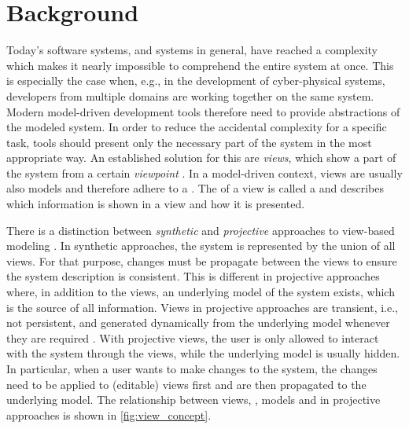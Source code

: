 \section{Background}
\label{sec:Background}

Today's software systems, and systems in general, have reached a complexity which makes it nearly impossible to comprehend the entire system at once.
This is especially the case when, e.g., in the development of cyber-physical systems, developers from multiple domains are working together on the same system.
Modern model-driven development tools therefore need to provide abstractions of the modeled system.
In order to reduce the accidental complexity for a specific task, tools should present only the necessary part of the system in the most appropriate way.
An established solution for this are \emph{views}, which show a part of the system from a certain \emph{viewpoint} \autocite{atkinson_orthographic_2010}.
In a model-driven context, views are usually also models and therefore adhere to a \metamodel.
The \metamodel of a view is called a \viewtype \autocite{goldschmidt_towards_2012} and describes which information is shown in a view and how it is presented.

There is a distinction between \emph{synthetic} and \emph{projective} approaches to view-based modeling \autocite{atkinson_fundamental_2015}.
In synthetic approaches, the system is represented by the union of all views.
For that purpose, changes must be propagate between the views to ensure the system description is consistent.
This is different in projective approaches where, in addition to the views, an underlying model of the system exists, which is the source of all information.
Views in projective approaches are transient, i.e., not persistent, and generated dynamically from the underlying model whenever they are required \autocite{atkinson_orthographic_2010}.
With projective views, the user is only allowed to interact with the system through the views, while the underlying model is usually hidden.
In particular, when a user wants to make changes to the system, the changes need to be applied to (editable) views first and are then propagated to the underlying model.
The relationship between views, \viewtypes, models and \metamodels in projective approaches is shown in \autoref{fig:view_concept}.

